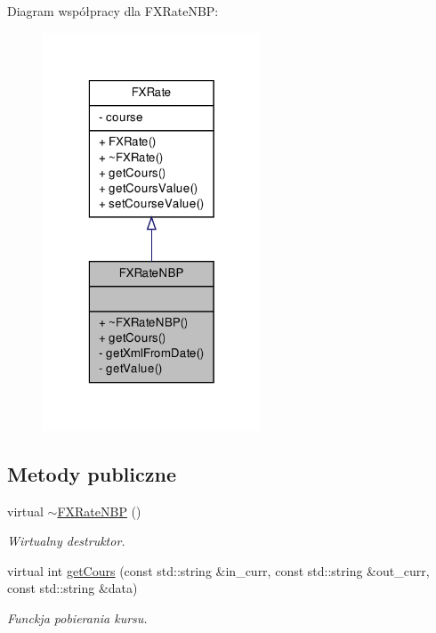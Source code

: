 \-Diagram współpracy dla \-F\-X\-Rate\-N\-B\-P\-:\nopagebreak
\begin{figure}[H]
\begin{center}
\leavevmode
\includegraphics[width=184pt]{class_f_x_rate_n_b_p__coll__graph}
\end{center}
\end{figure}
\subsection*{\-Metody publiczne}
\begin{DoxyCompactItemize}
\item 
virtual \hyperlink{class_f_x_rate_n_b_p_accf3fcef0c6844e38a1c338c509be3a0}{$\sim$\-F\-X\-Rate\-N\-B\-P} ()
\begin{DoxyCompactList}\small\item\em \-Wirtualny destruktor. \end{DoxyCompactList}\item 
virtual int \hyperlink{class_f_x_rate_n_b_p_a9207ac2af86b2a28887aace843dc5a64}{get\-Cours} (const std\-::string \&in\-\_\-curr, const std\-::string \&out\-\_\-curr, const std\-::string \&data)
\begin{DoxyCompactList}\small\item\em \-Funckja pobierania kursu. \end{DoxyCompactList}\end{DoxyCompactItemize}
